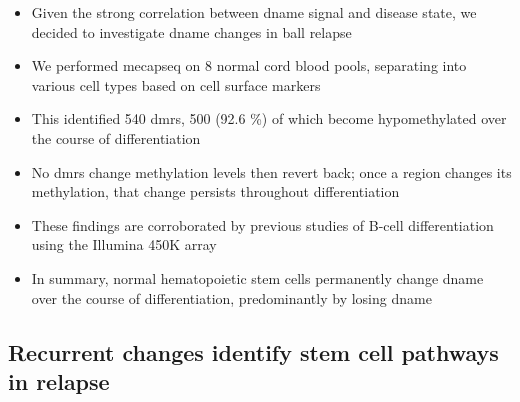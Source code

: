 \begin{itemize}
  \item Given the strong correlation between \gls{dname} signal and disease state, we decided to investigate \gls{dname} changes in \gls{ball} relapse
  \item We performed \gls{mecapseq} on 8 normal cord blood pools, separating into various cell types based on cell surface markers 
  \item This identified 540 \glspl{dmr}, 500 (92.6 \%) of which become hypomethylated over the course of differentiation
  \item No \glspl{dmr} change methylation levels then revert back; once a region changes its methylation, that change persists throughout differentiation
  \item These findings are corroborated by previous studies of B-cell differentiation using the Illumina 450K array \cite{leeGlobalDNAMethylation2012,leeEpigeneticRemodelingBcell2015,nordlundGenomewideSignaturesDifferential2013}
  \item In summary, normal hematopoietic stem cells permanently change \gls{dname} over the course of differentiation, predominantly by losing \gls{dname}
\end{itemize}


\subsection{Recurrent  changes identify stem cell pathways in relapse}


